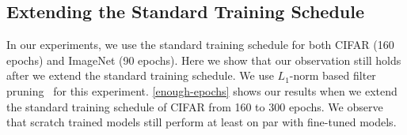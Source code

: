 \subsection{Extending the Standard Training Schedule}
In our experiments, we use the standard training schedule for both CIFAR (160 epochs) and ImageNet (90 epochs). Here we show that our observation still holds after we extend the standard training schedule. We use $L_1$-norm based filter pruning~\cite{li2016pruning} for this experiment. \autoref{enough-epochs} shows our results when we extend the standard training schedule of CIFAR from 160 to 300 epochs. We observe that scratch trained models still perform at least on par with fine-tuned models.

\setlength{\tabcolsep}{5pt}
\renewcommand{\arraystretch}{1.2}
\begin{table}[!htbp]
\small
\centering
{}
\caption{Results for $L_1$-norm filter pruning~\cite{li2016pruning} when the training schedule of the large model is extended from 160 to 300 epochs.
}
\label{enough-epochs}
\end{table}


